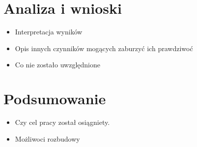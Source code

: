 \chapter{Analiza i wnioski }
\label{cha:pierwszyDokument}

\begin{itemize}
\item Interpretacja wyników
\item Opis innych czynników mogących zaburzyć ich prawdziwoć
\item Co nie zostało uwzględnione 
\end{itemize}


\chapter{Podsumowanie}
\label{cha:pierwszyDokument}

\begin{itemize}
\item Czy cel pracy został osiągniety.
\item Możliwoci rozbudowy
\end{itemize}
 




